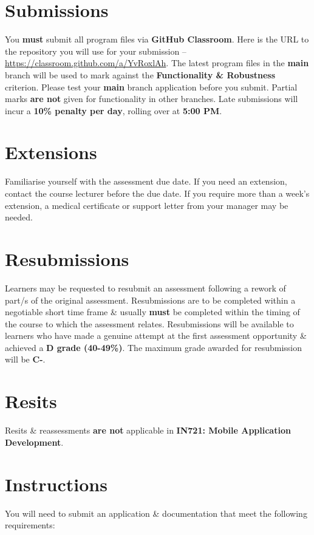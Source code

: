 \documentclass{article}
\begin{document}
\section*{Submissions}
You \textbf{must} submit all program files via \textbf{GitHub Classroom}. Here is the URL to the repository you will use for your submission – \href{https://classroom.github.com/a/YvRoxlAh}{https://classroom.github.com/a/YvRoxlAh}. The latest program files in the \textbf{main} branch will be used to mark against the \textbf{Functionality \& Robustness} criterion. Please test your \textbf{main} branch application before you submit. Partial marks \textbf{are not} given for functionality in other branches. Late submissions will incur a \textbf{10\% penalty per day}, rolling over at \textbf{5:00 PM}.

\section*{Extensions}
Familiarise yourself with the assessment due date. If you need an extension, contact the course lecturer before the due date. If you require more than a week's extension, a medical certificate or support letter from your manager may be needed.

\section*{Resubmissions}
Learners may be requested to resubmit an assessment following a rework of part/s of the original assessment. Resubmissions are to be completed within a negotiable short time frame \& usually \textbf{must} be completed within the timing of the course to which the assessment relates. Resubmissions will be available to learners who have made a genuine attempt at the first assessment opportunity \& achieved a \textbf{D grade (40-49\%)}. The maximum grade awarded for resubmission will be \textbf{C-}.

\section*{Resits}
Resits \& reassessments \textbf{are not} applicable in \textbf{IN721: Mobile Application Development}. 

\section*{Instructions}
You will need to submit an application \& documentation that meet the following requirements:
\end{document}
